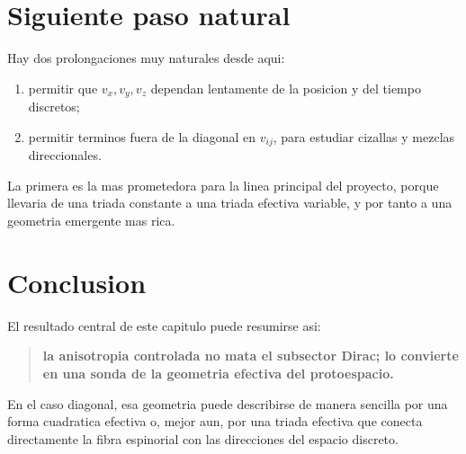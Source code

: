 \section{Siguiente paso natural}
Hay dos prolongaciones muy naturales desde aqui:
\begin{enumerate}[label=\arabic*.]
    \item permitir que \(v_x,v_y,v_z\) dependan lentamente de la posicion y del tiempo discretos;
    \item permitir terminos fuera de la diagonal en \(v_{ij}\), para estudiar cizallas y mezclas direccionales.
\end{enumerate}

La primera es la mas prometedora para la linea principal del proyecto, porque llevaria de una triada constante a una triada efectiva variable, y por tanto a una geometria emergente mas rica.

\section*{Conclusion}
El resultado central de este capitulo puede resumirse asi:
\begin{quote}
\textbf{la anisotropia controlada no mata el subsector Dirac; lo convierte en una sonda de la geometria efectiva del protoespacio.}
\end{quote}

En el caso diagonal, esa geometria puede describirse de manera sencilla por una forma cuadratica efectiva o, mejor aun, por una triada efectiva que conecta directamente la fibra espinorial con las direcciones del espacio discreto.
